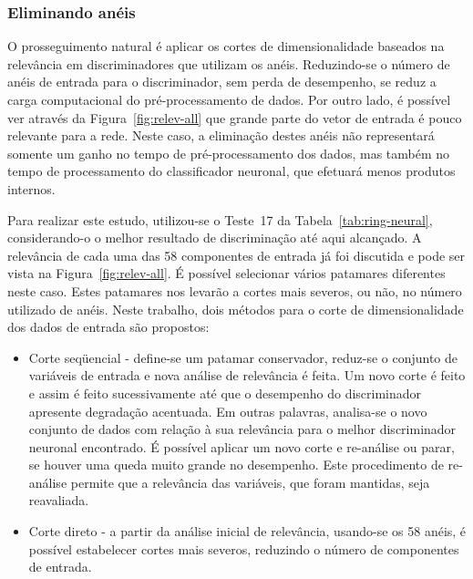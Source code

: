 \subsubsection{Eliminando anéis}

O prosseguimento natural é aplicar os cortes de dimensionalidade baseados na
relevância em discriminadores que utilizam os anéis. Reduzindo-se o número de
anéis de entrada para o discriminador, sem perda de desempenho, se reduz a
carga computacional do pré-processamento de dados. Por outro lado, é possível
ver através da Figura~\ref{fig:relev-all} que grande parte do vetor de entrada
é pouco relevante para a rede. Neste caso, a eliminação destes anéis não
representará somente um ganho no tempo de pré-processamento dos dados, mas
também no tempo de processamento do classificador neuronal, que efetuará menos
produtos internos.

Para realizar este estudo, utilizou-se o Teste~17 da
Tabela~\ref{tab:ring-neural}, considerando-o o melhor resultado de
discriminação até aqui alcançado. A relevância de cada uma das 58 componentes
de entrada já foi discutida e pode ser vista na Figura~\ref{fig:relev-all}. É
possível selecionar vários patamares diferentes neste caso. Estes patamares nos
levarão a cortes mais severos, ou não, no número utilizado de anéis. Neste
trabalho, dois métodos para o corte de dimensionalidade dos dados de
entrada são propostos:

\begin{itemize}
\item Corte seqüencial - define-se um patamar conservador, reduz-se o conjunto
de variáveis de entrada e nova análise de relevância é feita. Um novo corte é
feito e assim é feito sucessivamente até que o desempenho do discriminador
apresente degradação acentuada. Em outras palavras, analisa-se o novo conjunto
de dados com relação à sua relevância para o melhor discriminador neuronal
encontrado. É possível aplicar um novo corte e re-análise ou parar, se houver
uma queda muito grande no desempenho. Este procedimento de re-análise permite
que a relevância das variáveis, que foram mantidas, seja reavaliada.

\item Corte direto - a partir da análise inicial de relevância, usando-se os 58
anéis, é possível estabelecer cortes mais severos, reduzindo o número de
componentes de entrada.
\end{itemize}

